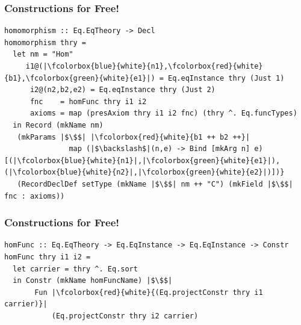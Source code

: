 \documentclass[t,10pt,numbers,fleqn,usenames,xcolor=dvipsnames]{beamer}
\begin{document}
\begin{frame}[fragile]

\end{frame}

\begin{frame}[fragile] 
\frametitle{Constructions for Free!} 


\begin{overprint}
\begin{verbatim} 
homomorphism :: Eq.EqTheory -> Decl
homomorphism thry =
  let nm = "Hom" 
     i1@(|\fcolorbox{blue}{white}{n1},\fcolorbox{red}{white}{b1},\fcolorbox{green}{white}{e1}|) = Eq.eqInstance thry (Just 1)
      i2@(n2,b2,e2) = Eq.eqInstance thry (Just 2)
      fnc    = homFunc thry i1 i2
      axioms = map (presAxiom thry i1 i2 fnc) (thry ^. Eq.funcTypes)  
  in Record (mkName nm)
   (mkParams |$\$$| |\fcolorbox{red}{white}{b1 ++ b2 ++}|
               map (|$\backslash$|(n,e) -> Bind [mkArg n] e) [(|\fcolorbox{blue}{white}{n1}|,|\fcolorbox{green}{white}{e1}|),(|\fcolorbox{blue}{white}{n2}|,|\fcolorbox{green}{white}{e2}|)])}
   (RecordDeclDef setType (mkName |$\$$| nm ++ "C") (mkField |$\$$| fnc : axioms))
\end{verbatim} 
\end{overprint}
\end{frame}

\begin{frame}[fragile] 
\frametitle{Constructions for Free!} 


\begin{overprint}
\begin{verbatim} 
homFunc :: Eq.EqTheory -> Eq.EqInstance -> Eq.EqInstance -> Constr 
homFunc thry i1 i2 =
  let carrier = thry ^. Eq.sort
  in Constr (mkName homFuncName) |$\$$|
       Fun |\fcolorbox{red}{white}{(Eq.projectConstr thry i1 carrier)}| 
           (Eq.projectConstr thry i2 carrier)  
\end{verbatim} 
\end{overprint}
\end{frame}
\end{document}
